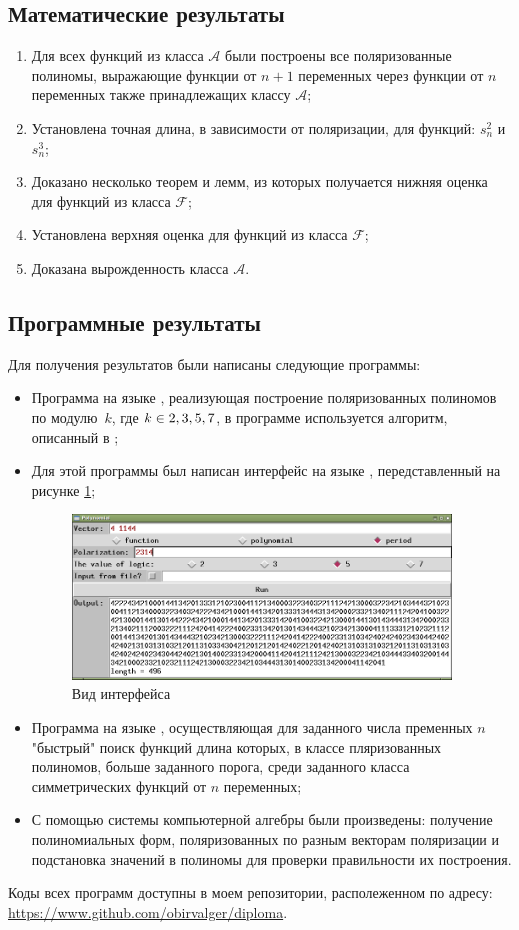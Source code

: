 \documentclass[bibliography=totoc, a4paper, 14pt]{extarticle}
\def\in{\mathchar"3232\nobreak\discretionary{}{\usefont{OMS}{cmsy}{m}{n}\char50}{}}
\begin{document}
\subsection{Математические результаты}
\begin{enumerate}
\item Для всех функций из класса $\mathcal{A}$ были построены все поляризованные
полиномы, выражающие функции от $n+1$ переменных через функции от $n$ переменных также принадлежащих
классу $\mathcal{A}$;
\item Установлена точная длина, в зависимости от поляризации, для функций: $s^2_n$ и $s^3_n$;
\item Доказано несколько теорем и лемм, из которых получается нижняя оценка для функций из
класса $\mathcal{F}$;
\item Установлена верхняя оценка для функций из класса $\mathcal{F}$;
\item Доказана вырожденность класса $\mathcal{A}$.
\end{enumerate}

\subsection{Программные результаты}
Для получения результатов были написаны следующие программы:
\begin{itemize}
\item Программа на языке {}, реализующая построение поляризованных полиномов по
    модулю~$k$, где $k \in {2,3,5,7}$, в программе используется алгоритм, описанный в \cite{sm09};
\item Для этой программы был написан интерфейс на языке {}, передставленный на
    рисунке \ref{ps};
    \begin{figure}[h]
    \centering
    \includegraphics[width=0.95\textwidth]{polyscreen.png}
    \caption{Вид интерфейса \label{ps}}
    \end{figure}
\item Программа на языке {}, осуществляющая для заданного числа пременных $n$
    "быстрый"{} поиск функций длина которых, в классе пляризованных полиномов, больше заданного
    порога, среди заданного класса симметрических функций от $n$ переменных;
\item С помощью системы компьютерной алгебры {} \cite{sage} были произведены:
    получение полиномиальных форм, поляризованных по разным векторам поляризации и подстановка
    значений в полиномы для проверки правильности их построения.
\end{itemize}
Коды всех программ доступны в моем репозитории, располеженном по адресу:
\mbox{\url{https://www.github.com/obirvalger/diploma}}.
\end{document}
